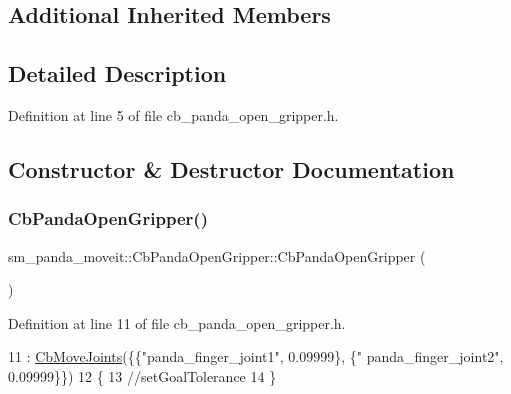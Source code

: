 \subsection*{Additional Inherited Members}


\subsection{Detailed Description}


Definition at line 5 of file cb\+\_\+panda\+\_\+open\+\_\+gripper.\+h.



\subsection{Constructor \& Destructor Documentation}
\mbox{\label{classsm__panda__moveit_1_1CbPandaOpenGripper_af5adc14214e1283b15684577dae136f1}} 
\subsubsection{\texorpdfstring{Cb\+Panda\+Open\+Gripper()}{CbPandaOpenGripper()}}
{\footnotesize\ttfamily sm\+\_\+panda\+\_\+moveit\+::\+Cb\+Panda\+Open\+Gripper\+::\+Cb\+Panda\+Open\+Gripper (\begin{DoxyParamCaption}{ }\end{DoxyParamCaption})\hspace{0.3cm}{\ttfamily [inline]}}



Definition at line 11 of file cb\+\_\+panda\+\_\+open\+\_\+gripper.\+h.


\begin{DoxyCode}
11                          : \hyperlink{classmoveit__z__client_1_1CbMoveJoints_a8d9f24fd96baa202c546654f3e92f51c}{CbMoveJoints}(\{\{\textcolor{stringliteral}{"panda\_finger\_joint1"}, 0.09999\}, \{\textcolor{stringliteral}{"
      panda\_finger\_joint2"}, 0.09999\}\})
12     \{
13         \textcolor{comment}{//setGoalTolerance}
14     \}
\end{DoxyCode}


